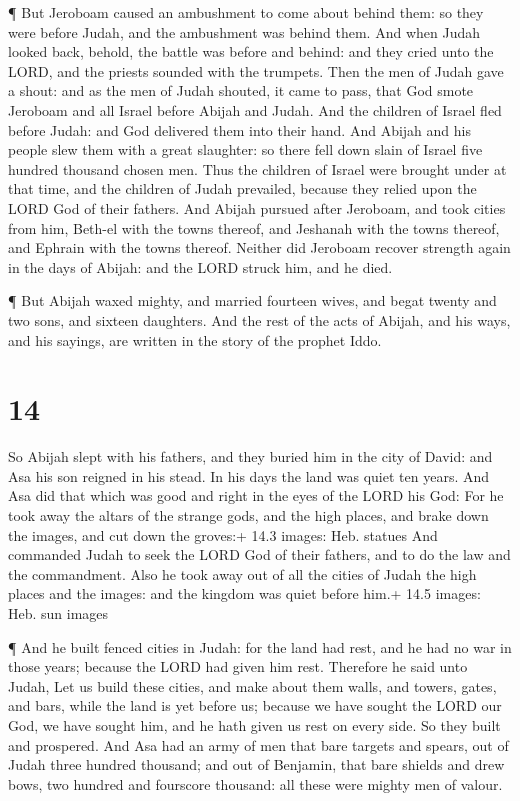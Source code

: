  ¶ But Jeroboam caused an ambushment to come about behind
them: so they were before Judah, and the ambushment was behind them.
 And when Judah looked back, behold, the battle was before
and behind: and they cried unto the LORD, and the priests sounded with
the trumpets.  Then the men of Judah gave a shout: and as
the men of Judah shouted, it came to pass, that God smote Jeroboam and
all Israel before Abijah and Judah.  And the children of
Israel fled before Judah: and God delivered them into their hand.
 And Abijah and his people slew them with a great
slaughter: so there fell down slain of Israel five hundred thousand
chosen men.  Thus the children of Israel were brought under
at that time, and the children of Judah prevailed, because they relied
upon the LORD God of their fathers.  And Abijah pursued
after Jeroboam, and took cities from him, Beth-el with the towns
thereof, and Jeshanah with the towns thereof, and Ephrain with the towns
thereof.  Neither did Jeroboam recover strength again in
the days of Abijah: and the LORD struck him, and he died.

 ¶ But Abijah waxed mighty, and married fourteen wives, and
begat twenty and two sons, and sixteen daughters.  And the
rest of the acts of Abijah, and his ways, and his sayings, are written
in the story of the prophet Iddo.

\hypertarget{section-13}{%
\section{14}\label{section-13}}

 So Abijah slept with his fathers, and they buried him in
the city of David: and Asa his son reigned in his stead. In his days the
land was quiet ten years.  And Asa did that which was good
and right in the eyes of the LORD his God:  For he took away
the altars of the strange gods, and the high places, and brake down the
images, and cut down the groves:+ 14.3 images: Heb. statues 
And commanded Judah to seek the LORD God of their fathers, and to do the
law and the commandment.  Also he took away out of all the
cities of Judah the high places and the images: and the kingdom was
quiet before him.+ 14.5 images: Heb. sun images

 ¶ And he built fenced cities in Judah: for the land had
rest, and he had no war in those years; because the LORD had given him
rest.  Therefore he said unto Judah, Let us build these
cities, and make about them walls, and towers, gates, and bars, while
the land is yet before us; because we have sought the LORD our God, we
have sought him, and he hath given us rest on every side. So they built
and prospered.  And Asa had an army of men that bare targets
and spears, out of Judah three hundred thousand; and out of Benjamin,
that bare shields and drew bows, two hundred and fourscore thousand: all
these were mighty men of valour.

